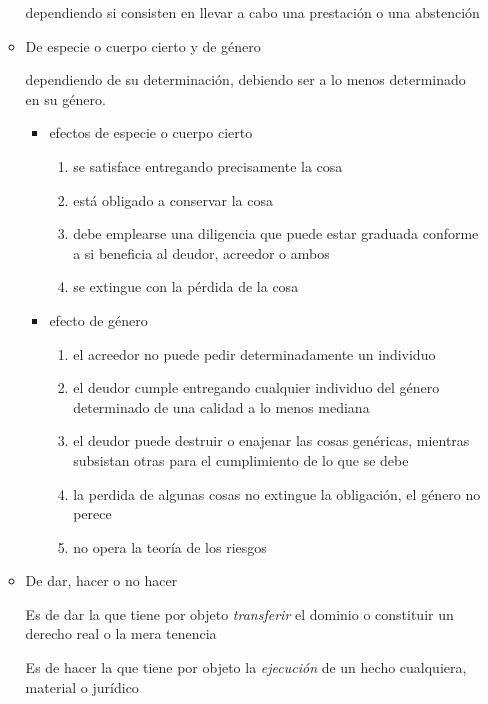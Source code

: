 \documentclass[]{article}
\providecommand{\tightlist}{%
  \setlength{\itemsep}{0pt}\setlength{\parskip}{0pt}}
\begin{document}
\begin{itemize}
\begin{itemize}
    dependiendo si consisten en llevar a cabo una prestación o una
    abstención
  \item
    De especie o cuerpo cierto y de género

    dependiendo de su determinación, debiendo ser a lo menos determinado
    en su género.

    \begin{itemize}
    \tightlist
    \item
      efectos de especie o cuerpo cierto

      \begin{enumerate}
      \def\labelenumi{\arabic{enumi}.}
      \tightlist
      \item
        se satisface entregando precisamente la cosa
      \item
        está obligado a conservar la cosa
      \item
        debe emplearse una diligencia que puede estar graduada conforme
        a si beneficia al deudor, acreedor o ambos
      \item
        se extingue con la pérdida de la cosa
      \end{enumerate}
    \item
      efecto de género

      \begin{enumerate}
      \def\labelenumi{\arabic{enumi}.}
      \tightlist
      \item
        el acreedor no puede pedir determinadamente un individuo
      \item
        el deudor cumple entregando cualquier individuo del género
        determinado de una calidad a lo menos mediana
      \item
        el deudor puede destruir o enajenar las cosas genéricas,
        mientras subsistan otras para el cumplimiento de lo que se debe
      \item
        la perdida de algunas cosas no extingue la obligación, el género
        no perece
      \item
        no opera la teoría de los riesgos
      \end{enumerate}
    \end{itemize}
  \item
    De dar, hacer o no hacer

    Es de dar la que tiene por objeto \emph{transferir} el dominio o
    constituir un derecho real o la mera tenencia

    Es de hacer la que tiene por objeto la \emph{ejecución} de un hecho
    cualquiera, material o jurídico


\end{itemize}
\end{itemize}
\end{document}
